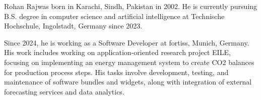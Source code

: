 \documentclass[journal]{IEEEtai}
\begin{document}
\begin{IEEEbiography}{Rohan Raj}{\space}was born in Karachi, Sindh, Pakistan in 2002. He is currently pursuing B.S. degree in computer science and artificial intelligence at Technische Hochschule, Ingolstadt, Germany since 2023.

Since 2024, he is working as a Software Developer at fortiss, Munich, Germany. His work includes working on application-oriented research project EILE, focusing on implementing an energy management system to create CO2 balances for production process steps. His tasks involve development, testing, and maintenance of software bundles and widgets, along with integration of external forecasting services and data analytics.

\end{IEEEbiography}
\end{document}
